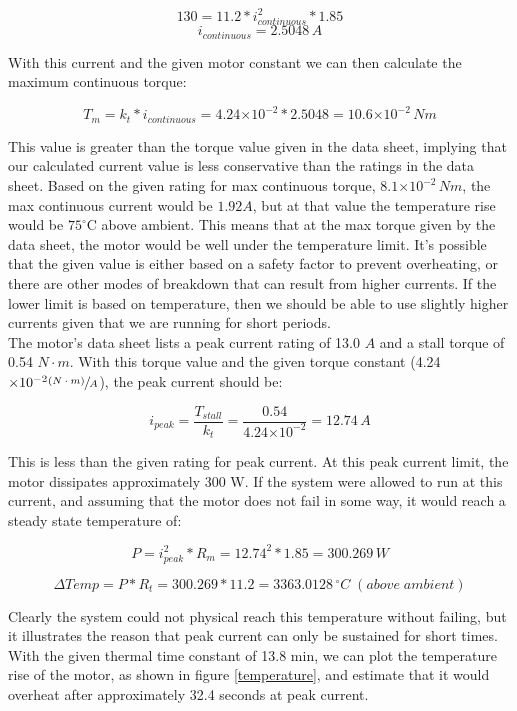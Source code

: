 \documentclass{article}
\theoremstyle{plain}
\theoremstyle{definition}
\theoremstyle{remark}
\providecommand{\e}[1]{\ensuremath{\times 10^{#1}}}
\begin{document}
$$130 = 11.2*i_{continuous}^2*1.85$$
$$i_{continuous} = 2.5048 \,A$$

With this current and the given motor constant we can then calculate the maximum continuous torque:

$$T_{m} = k_{t}*i_{continuous} = 4.24\e{-2}*2.5048 = 10.6\e{-2}\, Nm$$

This value is greater than the torque value given in the data sheet, implying that our calculated current value is less conservative than the ratings in the data sheet. Based on the given rating for max continuous torque, $8.1 \e{-2}\, Nm$, the max continuous current would be $1.92 A$, but at that value the temperature rise would be $75^\circ$C above ambient. This means that at the max torque given by the data sheet, the motor would be well under the temperature limit. It's possible that the given value is either based on a safety factor to prevent overheating, or there are other modes of breakdown that can result from higher currents. If the lower limit is based on temperature, then we should be able to use slightly higher currents given that we are running for short periods.\\

The motor's data sheet lists a peak current rating of 13.0 $A$ and a stall torque of 0.54 $N \cdot m$. With this torque value and the given torque constant (4.24$\e{-2} \sfrac{(N \cdot m)}{A}$), the peak current should be:


$$i_{peak} = \frac{T_{stall}}{k_{t}} = \frac{0.54}{4.24\e{-2}} = 12.74 \,A$$

This is less than the given rating for peak current. At this peak current limit, the motor dissipates approximately 300 W.  If the system were allowed to run at this current, and assuming that the motor does not fail in some way, it would reach a steady state temperature of:

$$P = i_{peak}^2 * R_{m} = 12.74^2 * 1.85 = 300.269 \,W$$

$$\Delta Temp = P * R_{t} = 300.269 * 11.2 = 3363.0128  \,{^\circ}C\;(above \;ambient)$$ 

Clearly the system could not physical reach this temperature without failing, but it illustrates the reason that peak current can only be sustained for short times. With the given thermal time constant of 13.8 min, we can plot the temperature rise of the motor, as shown in figure \ref{temperature}, and estimate that it would overheat after approximately 32.4 seconds at peak current. 
\end{document}
